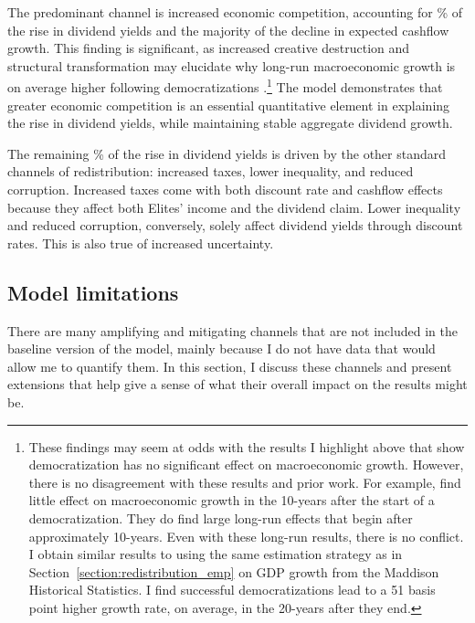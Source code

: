 The predominant channel is increased economic competition, accounting for \tabTwelveComp\% of the rise in dividend yields and the majority of the decline in expected cashflow growth. This finding is significant, as increased creative destruction and structural transformation may elucidate why long-run macroeconomic growth is on average higher following democratizations \citep*{Aghion2008,Aghion2014,Acemoglu2015,Bravo2021}.\footnote{These findings may seem at odds with the results I highlight above that show democratization has no significant effect on macroeconomic growth. However, there is no disagreement with these results and prior work. For example, \cite{Acemoglu2019} find little effect on macroeconomic growth in the 10-years after the start of a democratization. They do find large long-run effects that begin after approximately 10-years. Even with these long-run results, there is no conflict.  I obtain similar results to \citeauthor{Acemoglu2019} using the same estimation strategy as in Section~\ref{section:redistribution_emp} on GDP growth from the Maddison Historical Statistics. I find successful democratizations lead to a 51 basis point higher growth rate, on average, in the 20-years after they end.} The model demonstrates that greater economic competition is an essential quantitative element in explaining the rise in dividend yields, while maintaining stable aggregate dividend growth.

The remaining \tabTwelveNonComp\% of the rise in dividend yields is driven by the other standard channels of redistribution: increased taxes, lower inequality, and reduced corruption. Increased taxes come with both discount rate and cashflow effects because they affect both Elites' income and the dividend claim. Lower inequality and reduced corruption, conversely, solely affect dividend yields through discount rates. This is also true of increased uncertainty.

\subsection{Model limitations}\label{section:model_limitations}
There are many amplifying and mitigating channels that are not included in the baseline version of the model, mainly because I do not have data that would allow me to quantify them. In this section, I discuss these channels and present extensions that help give a sense of what their overall impact on the results might be.

